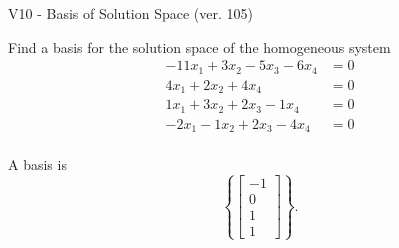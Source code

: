 \begin{exercise}
  \begin{exerciseTitle}V10 - Basis of Solution Space (ver. 105)\end{exerciseTitle}
  \begin{exerciseStatement}
    Find a basis for the solution space of the homogeneous system 
\begin{align*}
 -11 x_ 1 + 3 x_ 2 -5 x_ 3 -6 x_ 4 &= 0  \\ 
  4 x_ 1 + 2 x_ 2 + 4 x_ 4 &= 0  \\ 
  1 x_ 1 + 3 x_ 2 + 2 x_ 3 -1 x_ 4 &= 0  \\ 
  -2 x_ 1 -1 x_ 2 + 2 x_ 3 -4 x_ 4 &= 0  \\ 
 \end{align*}


 
  \end{exerciseStatement}

  \begin{exerciseAnswer}
   A basis is   
\[\left\{\left[\begin{array}{c}
-1 \\
0 \\
1 \\
1
\end{array}\right]\right\}.\]

  


  \end{exerciseAnswer}
\end{exercise}